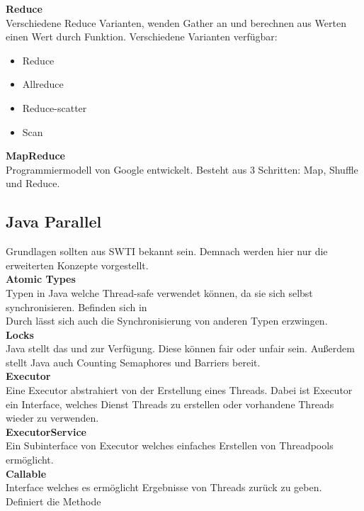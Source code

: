 \textbf{Reduce}\\
Verschiedene Reduce Varianten, wenden Gather an und berechnen aus Werten einen Wert durch Funktion.
Verschiedene Varianten verfügbar:
\begin{itemize}
  \item Reduce
  \item Allreduce
  \item Reduce-scatter
  \item Scan
\end{itemize}


\textbf{MapReduce}\\
Programmiermodell von Google entwickelt.
Besteht aus 3 Schritten: Map, Shuffle und Reduce.


\subsection{Java Parallel}
Grundlagen sollten aus SWTI bekannt sein. Demnach werden hier nur die erweiterten Konzepte vorgestellt.\\

\textbf{Atomic Types}\\
Typen in Java welche Thread-safe verwendet können, da sie sich selbst synchronisieren.
Befinden sich in \\
Durch  lässt sich auch die Synchronisierung von anderen Typen erzwingen.\\

\textbf{Locks}\\
Java stellt das  und  zur Verfügung. Diese können fair oder unfair sein.
Außerdem stellt Java auch Counting Semaphores und Barriers bereit.\\

\textbf{Executor}\\
Eine Executor abstrahiert von der Erstellung eines Threads. Dabei ist Executor ein Interface, welches Dienst Threads zu erstellen
oder vorhandene Threads wieder zu verwenden.\\

\textbf{ExecutorService}\\
Ein Subinterface von Executor welches einfaches Erstellen von Threadpools ermöglicht.\\

\textbf{Callable}\\
Interface welches es ermöglicht Ergebnisse von Threads zurück zu geben.
Definiert die Methode \\


